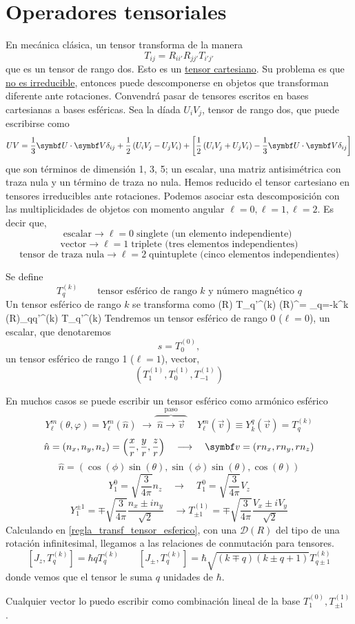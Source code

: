 \documentclass[10pt,oneside]{CBFT_book}
\begin{document}
\section{Operadores tensoriales}

En mecánica clásica, un tensor transforma de la manera
\[
	T_{ij} = R_{ii'} R_{jj'} T_{i' j'}
\]
que es un tensor de rango dos. Esto es un \underline{tensor cartesiano}. Su problema es que \underline{no es 
irreducible}, entonces puede descomponerse en objetos que transforman diferente ante rotaciones.
Convendrá pasar de tensores escritos en bases cartesianas a bases esféricas.
Sea la díada $U_iV_j$, tensor de rango dos, que puede escribirse como 
\[
	UV = \frac{1}{3}\vb{U}\cdot\vb{V}\delta_{ij} + \frac{1}{2}\left( U_iV_j - U_jV_i \right) +
	\left[ \frac{1}{2}\left( U_iV_j + U_jV_i \right) - \frac{1}{3}\vb{U}\cdot\vb{V}\delta_{ij}\right]
\]
que son términos de dimensión 1, 3, 5; un escalar, una matriz antisimétrica con traza nula y un término
de traza no nula.
Hemos reducido el tensor cartesiano en tensores irreducibles ante rotaciones. 
Podemos asociar esta descomposición con las multiplicidades de objetos con momento angular 
$\ell=0, \ell=1, \ell=2$. Es decir que,
\[
	\text{escalar} \longrightarrow \ell=0 \; \text{singlete (un elemento independiente) }
\]
\[
	\text{vector} \longrightarrow \ell=1 \; \text{triplete (tres elementos independientes)}
\]
\[
	\text{tensor de traza nula} \longrightarrow \ell=2 \; \text{quintuplete (cinco elementos 
independientes)}
\]

Se define 
\[
	T^{(k)}_q \qquad \text{tensor esférico de rango $k$ y número magnético $q$}
\]
Un tensor esférico de rango $k$ se transforma como 
\be
	(R) T_{q'}^{(k)} (R)^\dagger = 
	\sum_{q=-k}^k \: (R)_{qq'}^{(k)} T_{q'}^{(k)} 
	\label{regla_transf_tensor_esferico}
\ee
Tendremos un tensor esférico de rango 0 ($\ell=0$), un escalar, que denotaremos
\[
	s = T^{(0)}_0, 
\]
un tensor esférico de rango 1 ($\ell=1$), vector,
\[
	(T^{(1)}_1,T^{(1)}_0,T^{(1)}_{-1})
\]

En muchos casos se puede escribir un tensor esférico como armónico esférico 
\[
	Y_\ell^{m}(\theta,\varphi) = Y_\ell^{m}(\hat{n}) \; \longrightarrow 
	\overbrace{ \phantom{.}\hat{n} \longrightarrow \vec{v}\phantom{.}}^{\text{paso}} \quad
	Y_\ell^m(\vec{v}) \equiv Y_k^q(\vec{v}) = T_q^{(k)}
\]
\[
	\hat{n} = (n_x,n_y,n_z) = \left( \frac{x}{r}, \frac{y}{r}, \frac{z}{r} \right) \quad 
	\longrightarrow \quad \vb{v} = (rn_x,rn_y,rn_z)
\]
\[
	\hat{n} = ( \cos(\phi)\sin(\theta), \sin(\phi)\sin(\theta), \cos(\theta))
\]
\[
	Y_1^0 = \sqrt{\frac{3}{4\pi}}n_z \quad \longrightarrow \quad T_1^0 = \sqrt{\frac{3}{4\pi}}V_z
\]
\[
	Y_1^{\pm 1} = \mp \sqrt{\frac{3}{4\pi}} \frac{n_x \pm i n_y}{\sqrt{2}} \quad \longrightarrow
	T_{\pm 1}^{(1)} = \mp \sqrt{\frac{3}{4\pi}} \frac{V_x \pm i V_y}{\sqrt{2}}
\]
Calculando en \eqref{regla_transf_tensor_esferico}, con una $\mathcal{D}(R)$ del tipo de una rotación 
infinitesimal, llegamos a las relaciones de conmutación para tensores.
\[
	[ J_z, T_q^{(k)} ] = \hbar q T_q^{(k)} \qquad 
	[J_{\pm},T_q^{(k)}] = \hbar \sqrt{(k \mp q)(k\pm q + 1)} T_{q\pm 1}^{(k)}
\]
donde vemos que el tensor le suma $q$ unidades de $\hbar$.

Cualquier vector lo puedo escribir como combinación lineal de la base $T_1^{(0)}, T_{\pm 1}^{(1)}$.

\end{document}
